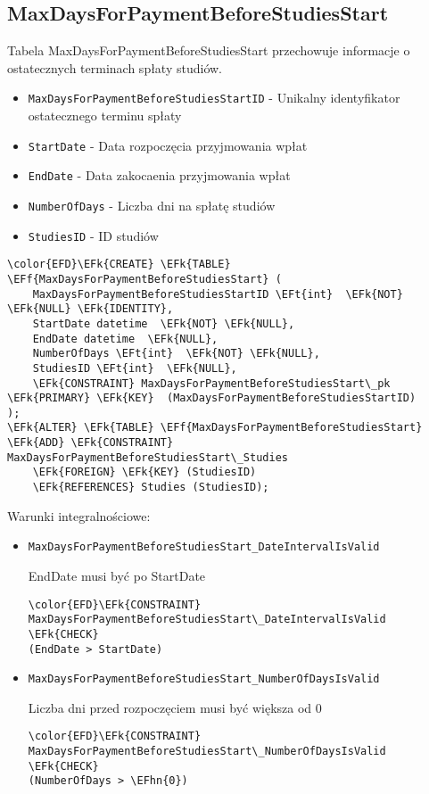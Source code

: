 \documentclass[11pt]{article}
\newcommand{\EFk}[1]{\textcolor{EFk}{\textbf{#1}}} %
\newcommand{\EFf}[1]{\textcolor{EFf}{#1}} %
\newcommand{\EFt}[1]{\textcolor{EFt}{\textbf{#1}}} %
\newcommand{\EFhn}[1]{\textcolor{EFhn}{#1}} %
\begin{document}
\subsection{MaxDaysForPaymentBeforeStudiesStart}
\label{sec:org19e6b4a}
Tabela MaxDaysForPaymentBeforeStudiesStart przechowuje informacje o ostatecznych terminach spłaty studiów.
\begin{itemize}
\item \texttt{MaxDaysForPaymentBeforeStudiesStartID} - Unikalny identyfikator ostatecznego terminu spłaty
\item \texttt{StartDate} - Data rozpoczęcia przyjmowania wpłat
\item \texttt{EndDate} - Data zakocaenia przyjmowania wpłat
\item \texttt{NumberOfDays} - Liczba dni na spłatę studiów
\item \texttt{StudiesID} - ID studiów
\end{itemize}
\begin{Code}
\begin{Verbatim}
\color{EFD}\EFk{CREATE} \EFk{TABLE} \EFf{MaxDaysForPaymentBeforeStudiesStart} (
    MaxDaysForPaymentBeforeStudiesStartID \EFt{int}  \EFk{NOT} \EFk{NULL} \EFk{IDENTITY},
    StartDate datetime  \EFk{NOT} \EFk{NULL},
    EndDate datetime  \EFk{NULL},
    NumberOfDays \EFt{int}  \EFk{NOT} \EFk{NULL},
    StudiesID \EFt{int}  \EFk{NULL},
    \EFk{CONSTRAINT} MaxDaysForPaymentBeforeStudiesStart\_pk \EFk{PRIMARY} \EFk{KEY}  (MaxDaysForPaymentBeforeStudiesStartID)
);
\EFk{ALTER} \EFk{TABLE} \EFf{MaxDaysForPaymentBeforeStudiesStart} \EFk{ADD} \EFk{CONSTRAINT} MaxDaysForPaymentBeforeStudiesStart\_Studies
    \EFk{FOREIGN} \EFk{KEY} (StudiesID)
    \EFk{REFERENCES} Studies (StudiesID);
\end{Verbatim}
\end{Code}
Warunki integralnościowe:


\begin{itemize}
\item \texttt{MaxDaysForPaymentBeforeStudiesStart\_DateIntervalIsValid}

EndDate musi być po StartDate
\begin{Code}
\begin{Verbatim}
\color{EFD}\EFk{CONSTRAINT} MaxDaysForPaymentBeforeStudiesStart\_DateIntervalIsValid \EFk{CHECK}
(EndDate > StartDate)
\end{Verbatim}
\end{Code}
\item \texttt{MaxDaysForPaymentBeforeStudiesStart\_NumberOfDaysIsValid}

Liczba dni przed rozpoczęciem musi być większa od 0
\begin{Code}
\begin{Verbatim}
\color{EFD}\EFk{CONSTRAINT} MaxDaysForPaymentBeforeStudiesStart\_NumberOfDaysIsValid \EFk{CHECK}
(NumberOfDays > \EFhn{0})
\end{Verbatim}
\end{Code}
\end{itemize}
\end{document}
